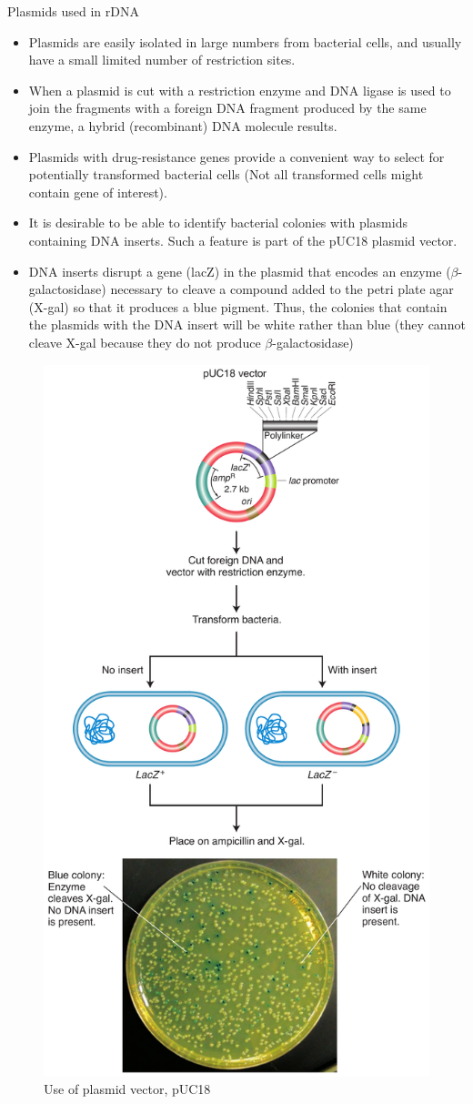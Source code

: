 \documentclass[11pt,dvipsnames,ignorenonframetext,aspectratio=169]{beamer}
\providecommand{\tightlist}{%
  \setlength{\itemsep}{0pt}\setlength{\parskip}{0pt}}
\begin{document}
\begin{frame}{Plasmids used in rDNA}
\protect\hypertarget{plasmids-used-in-rdna}{}

\begin{itemize}
\tightlist
\item
  Plasmids are easily isolated in large numbers from bacterial cells,
  and usually have a small limited number of restriction sites.
\item
  When a plasmid is cut with a restriction enzyme and DNA ligase is used
  to join the fragments with a foreign DNA fragment produced by the same
  enzyme, a hybrid (recombinant) DNA molecule results.
\item
  Plasmids with drug-resistance genes provide a convenient way to select
  for potentially transformed bacterial cells (Not all transformed cells
  might contain gene of interest).
\item
  It is desirable to be able to identify bacterial colonies with
  plasmids containing DNA inserts. Such a feature is part of the pUC18
  plasmid vector.
\item
  DNA inserts disrupt a gene (lacZ) in the plasmid that encodes an
  enzyme (\(\beta\)-galactosidase) necessary to cleave a compound added
  to the petri plate agar (X-gal) so that it produces a blue pigment.
  Thus, the colonies that contain the plasmids with the DNA insert will
  be white rather than blue (they cannot cleave X-gal because they do
  not produce \(\beta\)-galactosidase)
\end{itemize}

\end{frame}

\begin{frame}{}
\protect\hypertarget{section-23}{}

\begin{figure}
\includegraphics[width=0.25\linewidth]{./../images/plasmid_vector_pUC18} \caption{Use of plasmid vector, pUC18}\label{fig:phage-vector}
\end{figure}

\end{frame}
\end{document}
